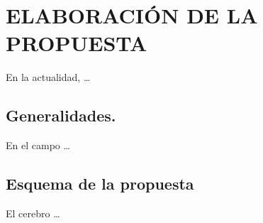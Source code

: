 \chapter{ELABORACIÓN DE LA PROPUESTA}
\label{chapter:elaboracion}

En la actualidad, \ldots


\section{Generalidades.}
\label{section:generalidades}
En el campo \ldots


\section{Esquema de la propuesta}
El cerebro \ldots


